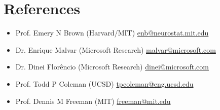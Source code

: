 \section*{References}

\begin{itemize}

    \item Prof. Emery N Brown (Harvard/MIT) \href{mailto:enb@neurostat.mit.edu}{enb@neurostat.mit.edu}

    \item Dr. Enrique Malvar (Microsoft Research) \href{mailto:malvar@microsoft.com}{malvar@microsoft.com}

    \item Dr. Dinei Flor{\^e}ncio (Microsoft Research) \href{mailto:dinei@microsoft.com}{dinei@microsoft.com}

    \item Prof. Todd P Coleman (UCSD) \href{mailto:tpcoleman@eng.ucsd.edu}{tpcoleman@eng.ucsd.edu}

    \item Prof. Dennis M Freeman (MIT)  \href{mailto:freeman@mit.edu}{freeman@mit.edu}
  \end{itemize}
